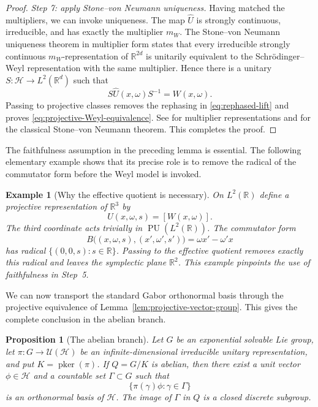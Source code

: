 \documentclass[10pt,a4paper]{amsart}
\numberwithin{equation}{section}
\newtheorem{proposition}[theorem]{Proposition}
\newtheorem{example}[theorem]{Example}
\newcommand{\cH}{\mathcal H}
\newcommand{\R}{\mathbb R}
\newcommand{\U}{\mathcal U}
\newcommand{\PU}{\operatorname{PU}}
\newcommand{\pker}{\operatorname{pker}}
\newcommand{\Step}[1]{\par\medskip\noindent\textit{#1.}\quad}
\begin{document}
\begin{proof}
\Step{Step 7: apply Stone--von Neumann uniqueness}
Having matched the multipliers, we can invoke uniqueness.  The map
$\widehat U$ is strongly continuous, irreducible, and has exactly the
multiplier $m_W$.  The Stone--von Neumann uniqueness theorem in multiplier
form states that every irreducible strongly continuous $m_W$-representation
of $\R^{2d}$ is unitarily equivalent to the Schr\"odinger--Weyl
representation with the same multiplier.  Hence there is a unitary
$S:\cH\to L^2(\R^d)$ such that
\[
 S\widehat U(x,\omega)S^{-1}=W(x,\omega).
\]
Passing to projective classes removes the rephasing in
\eqref{eq:rephased-lift} and proves
\eqref{eq:projective-Weyl-equivalence}.  See
\cite[Theorem~3.3 and p.~314]{BaggettKleppner1973} for multiplier
representations and \cite[Theorem~1.50]{Folland1989} for the classical
Stone--von Neumann theorem.  This completes the proof.
\end{proof}

The faithfulness assumption in the preceding lemma is essential.  The
following elementary example shows that its precise role is to remove the
radical of the commutator form before the Weyl model is invoked.

\begin{example}[Why the effective quotient is necessary]
\label{ex:radical-before-quotient}
On $L^2(\R)$ define a projective representation of $\R^3$ by
\[
 U(x,\omega,s)=[W(x,\omega)].
\]
The third coordinate acts trivially in $\PU(L^2(\R))$.  The commutator form
\[
 B\bigl((x,\omega,s),(x',\omega',s')\bigr)
 =\omega x'-\omega'x
\]
has radical $\{(0,0,s):s\in\R\}$.  Passing to the effective quotient removes
exactly this radical and leaves the symplectic plane $\R^2$.  This example
pinpoints the use of faithfulness in Step~5.
\end{example}

We can now transport the standard Gabor orthonormal basis through the
projective equivalence of Lemma~\ref{lem:projective-vector-group}.  This
gives the complete conclusion in the abelian branch.

\begin{proposition}[The abelian branch]
\label{prop:abelian-quotient}
Let $G$ be an exponential solvable Lie group, let
$\pi:G\to\U(\cH)$ be an infinite-dimensional irreducible unitary
representation, and put $K=\pker(\pi)$.  If $Q=G/K$ is abelian, then there
exist a unit vector $\phi\in\cH$ and a countable set $\Gamma\subset G$ such
that
\[
 \{\pi(\gamma)\phi:\gamma\in\Gamma\}
\]
is an orthonormal basis of $\cH$.  The image of $\Gamma$ in $Q$ is a closed
discrete subgroup.
\end{proposition}
\end{document}
